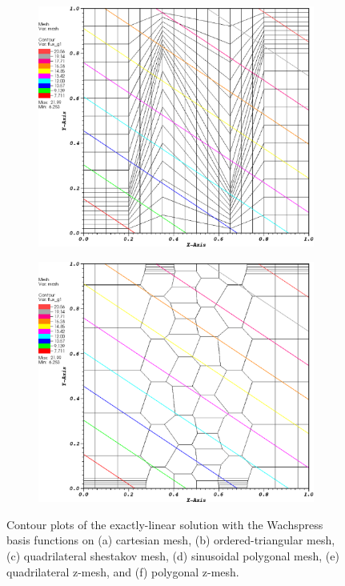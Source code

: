 \begin{figure}
\begin{subfigure}[b]{0.45\textwidth}
		\caption{}
	\end{subfigure}
	\vfill
	\begin{subfigure}[b]{0.45\textwidth}
		\centering
		\label{subfig::z_quad_wach_lin_sol}
		\includegraphics[width=\textwidth]{figures/sec_BF/z_quad_WACHSPRESS_k1.eps}
		\caption{}
	\end{subfigure}
	\hfill
	\begin{subfigure}[b]{0.45\textwidth}
		\centering
		\label{subfig::z_poly_wach_lin_sol}
		\includegraphics[width=\textwidth]{figures/sec_BF/z_poly_WACHSPRESS_k1.eps}
		\caption{}
	\end{subfigure}
\caption{Contour plots of the exactly-linear solution with the Wachspress basis functions on (a) cartesian mesh, (b) ordered-triangular mesh, (c) quadrilateral shestakov mesh, (d) sinusoidal polygonal mesh, (e) quadrilateral z-mesh, and (f) polygonal z-mesh.}
\label{fig::BF_Results_Linear_wach_sol}
\end{figure}
